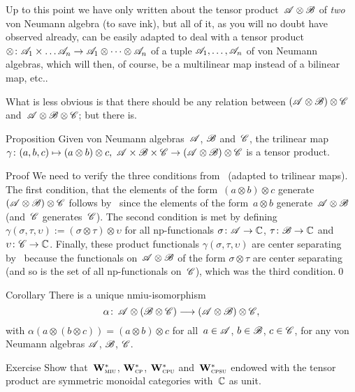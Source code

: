 \documentclass[a]{subfiles}
\begin{document}
\begin{parsec}%
\begin{point}%
Up to this point
we have only written about the tensor product~$\mathscr{A}\otimes \mathscr{B}$
of \emph{two} von Neumann algebra
(to save ink),
but all of it,
as you will no doubt have observed already,
can be easily adapted 
to deal with
a tensor product
$\otimes\colon \mathscr{A}_1\times\dotsc\mathscr{A}_n
\to\mathscr{A}_1\otimes \dotsb\otimes \mathscr{A}_n$
of a tuple $\mathscr{A}_1,\dotsc,\mathscr{A}_n$ of von Neumann algebras,
which will then, of course, be a multilinear map
instead of a bilinear map, etc..

What is less obvious
is that there should be any relation
between 
$(\mathscr{A}\otimes\mathscr{B})\otimes \mathscr{C}$
and~$\mathscr{A}\otimes\mathscr{B}\otimes\mathscr{C}$;
but there is.
\end{point}
\begin{point}{Proposition}%
Given von Neumann algebras~$\mathscr{A}$, $\mathscr{B}$ and~$\mathscr{C}$,
the trilinear map $\gamma\colon (a,b,c)\mapsto (a\otimes b)\otimes c,\ 
\scrA\times\scrB\times\scrC \to (\scrA\otimes \scrB)\otimes\scrC$
is a tensor product.
\begin{point}{Proof}%
We need to verify the three conditions
from~ (adapted
to trilinear maps).
The first condition,
that the elements of the form~$(a\otimes b)\otimes c$
generate $(\mathscr{A}\otimes \mathscr{B})\otimes \mathscr{C}$
follows
by~
since
the elements of the form~$a\otimes b$
generate~$\mathscr{A}\otimes \mathscr{B}$
(and~$\mathscr{C}$ generates~$\mathscr{C}$).
The second condition
is met by defining
$\gamma(\sigma,\tau,\upsilon):= (\sigma\otimes\tau)\otimes\upsilon$
for all np-functionals
$\sigma\colon \mathscr{A}\to\mathbb{C}$,
$\tau\colon \mathscr{B} \to\mathbb{C}$
and~$\upsilon\colon \mathscr{C}\to\mathbb{C}$.
Finally,
these product functionals
$\gamma(\sigma,\tau,\upsilon)$
are center separating by~
because
the functionals on~$\mathscr{A}\otimes \mathscr{B}$
of the form $\sigma\otimes\tau$
are center separating (and so is
the set of all np-functionals on~$\mathscr{C}$),
which was the third condition.\qed
\end{point}
\end{point}
\begin{point}{Corollary}%
There is a unique nmiu-isomorphism
\begin{equation*}
		\alpha\colon \, \mathscr{A}\otimes(\mathscr{B}\otimes \mathscr{C})
\longrightarrow  (\mathscr{A} \otimes \mathscr{B})\otimes\mathscr{C},
\end{equation*}
with $\alpha(a\otimes(b\otimes c))=(a\otimes b)\otimes c$
for all~$a\in\mathscr{A}$, $b\in\mathscr{B}$, $c\in\mathscr{C}$,
for any von Neumann algebras
$\mathscr{A}$, $\mathscr{B}$, $\mathscr{C}$.
\end{point}
\begin{point}[vn-smc]{Exercise}%
Show that~$\mathbf{W}^*_{\text{\textsc{miu}}}$, $\mathbf{W}^*_{\text{\textsc{cp}}}$, $\mathbf{W}^*_{\text{\textsc{cpu}}}$
and~$\mathbf{W}^*_{\text{\textsc{cpsu}}}$ endowed with the tensor product
are symmetric monoidal categories with~$\mathbb{C}$ as unit.
\end{point}
\end{parsec}
\end{document}
